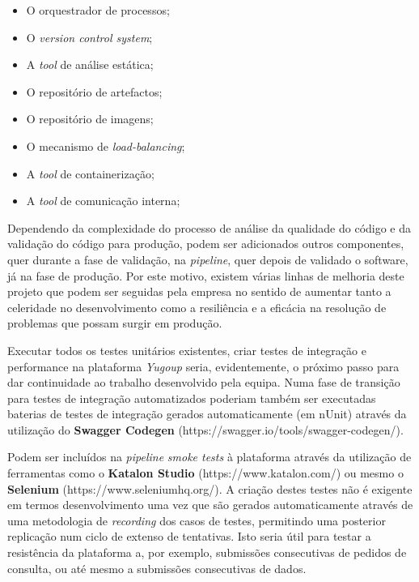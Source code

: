 \begin{itemize}
 \item O orquestrador de processos;
 \item O \textit{version control system};
 \item A \textit{tool} de análise estática;
 \item O repositório de artefactos;
 \item O repositório de imagens;
 \item O mecanismo de \textit{load-balancing};
 \item A \textit{tool} de containerização;
 \item A \textit{tool} de comunicação interna;
\end{itemize}

\hspace{1cm}Dependendo da complexidade do processo de análise da qualidade do código e da validação do código para produção, podem ser adicionados outros componentes, quer durante a fase de validação, na \textit{pipeline}, quer depois de validado o software, já na fase de produção. Por este motivo, existem várias linhas de melhoria deste projeto que podem ser seguidas pela empresa no sentido de aumentar tanto a celeridade no desenvolvimento como a resiliência e a eficácia na resolução de problemas que possam surgir em produção. 

\hspace{1cm}Executar todos os testes unitários existentes, criar testes de integração e performance na plataforma \textit{Yugoup} seria, evidentemente, o próximo passo para dar continuidade ao trabalho desenvolvido pela equipa. Numa fase de transição para testes de integração automatizados poderiam também ser executadas baterias de testes de integração gerados automaticamente (em nUnit) através da utilização do \textbf{Swagger Codegen} (https://swagger.io/tools/swagger-codegen/). 

\hspace{1cm}Podem ser incluídos na \textit{pipeline} \textit{smoke tests} à plataforma através da utilização de ferramentas como o \textbf{Katalon Studio} (https://www.katalon.com/) ou mesmo o \textbf{Selenium} (https://www.seleniumhq.org/). A criação destes testes não é exigente em termos desenvolvimento uma vez que são gerados automaticamente através de uma metodologia de \textit{recording} dos casos de testes, permitindo uma posterior replicação num ciclo de extenso de tentativas. Isto seria útil para testar a resistência da plataforma a, por exemplo, submissões consecutivas de pedidos de consulta, ou até mesmo a submissões consecutivas de dados.

